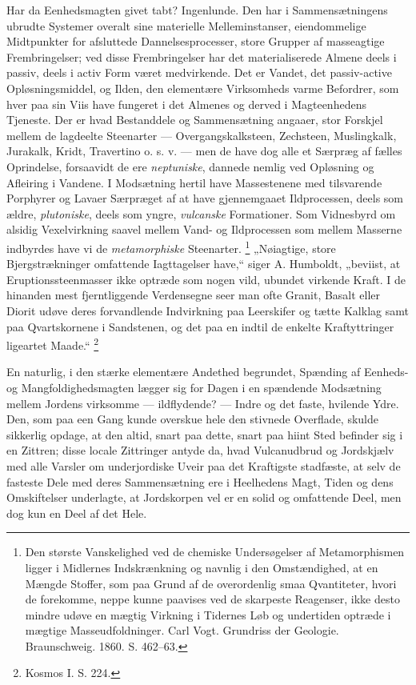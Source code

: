\documentclass[12pt,a4paper]{book}
\renewcommand{\thefootnote}{*)}
\begin{document}
Har da Eenhedsmagten givet tabt? Ingenlunde. Den har i Sammensætningens
ubrudte Systemer overalt sine materielle Melleminstanser, eiendommelige
Midtpunkter for afsluttede Dannelsesprocesser, store Grupper af
masseagtige Frembringelser; ved disse Frembringelser har det
materialiserede Almene deels i passiv, deels i activ Form været
medvirkende. Det er Vandet, det passiv-active Opløsningsmiddel, og Ilden,
den elementære Virksomheds varme Befordrer, som hver paa sin Viis have
fungeret i det Almenes og derved i Magteenhedens Tjeneste. Der er hvad
Bestanddele og Sammensætning angaaer, stor Forskjel mellem de lagdeelte
Steenarter --- Overgangskalksteen, Zechsteen, Muslingkalk, Jurakalk,
Kridt, Travertino o. s. v. --- men de have dog alle et Særpræg af fælles
Oprindelse, forsaavidt de ere \emph{neptuniske}, dannede nemlig ved
Opløsning og Afleiring i Vandene. I Modsætning hertil have Massestenene
med tilsvarende Porphyrer og Lavaer Særpræget af at have gjennemgaaet
Ildprocessen, deels som ældre, \emph{plutoniske}, deels som yngre,
\emph{vulcanske} Formationer. Som Vidnesbyrd om alsidig Vexelvirkning
saavel mellem Vand- og Ildprocessen
som mellem Masserne indbyrdes have vi de \emph{metamorphiske}
Steenarter.%
\footnote{%
Den største Vanskelighed ved de chemiske Undersøgelser af
Metamorphismen ligger i Midlernes Indskrænkning og navnlig i den
Omstændighed, at en Mængde Stoffer, som paa Grund af de overordenlig
smaa Qvantiteter, hvori de forekomme, neppe kunne paavises ved de
skarpeste Reagenser, ikke desto mindre udøve en mægtig Virkning i
Tidernes Løb og undertiden optræde i mægtige Masseudfoldninger. Carl
Vogt. Grundriss der Geologie. Braunschweig. 1860. S. 462--63.}
„Nøiagtige, store Bjergstrækninger omfattende Iagttagelser have,“
siger A. Humboldt, „beviist, at Eruptionssteenmasser ikke optræde som
nogen vild, ubundet virkende Kraft. I de hinanden mest fjerntliggende
Verdensegne seer man ofte Granit, Basalt eller Diorit udøve deres
forvandlende Indvirkning paa Leerskifer og tætte Kalklag samt paa
Qvartskornene i Sandstenen, og det paa en indtil de enkelte
Kraftyttringer ligeartet Maade.“%
\renewcommand{\thefootnote}{**)}%
\footnote{%
Kosmos I. S. 224.}%
\renewcommand{\thefootnote}{*)}

En naturlig, i den stærke elementære Andethed begrundet, Spænding af
Eenheds- og Mangfoldighedsmagten lægger sig for Dagen i en spændende
Modsætning mellem Jordens virksomme --- ildflydende? --- Indre og det
faste, hvilende Ydre. Den, som paa een Gang kunde overskue hele den
stivnede Overflade, skulde sikkerlig opdage, at den altid, snart paa
dette, snart paa hiint Sted befinder sig i en Zittren; disse locale
Zittringer antyde da, hvad Vulcanudbrud og Jordskjælv med alle Varsler om
underjordiske Uveir paa det Kraftigste stadfæste, at selv de fasteste
Dele med deres Sammensætning ere i Heelhedens Magt, Tiden og dens
Omskiftelser underlagte, at Jordskorpen vel er en solid og omfattende
Deel, men dog kun en Deel af det Hele.
\end{document}

